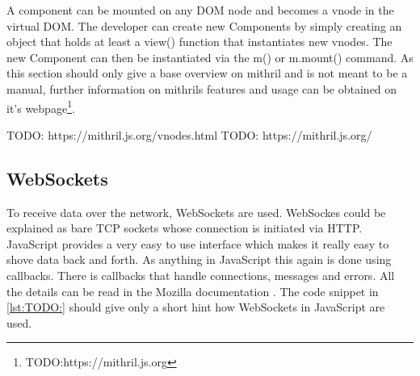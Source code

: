A component can be mounted on any DOM node and becomes a vnode in the virtual DOM. The developer can create new Components by simply creating an object that holds at least a view() function that instantiates new vnodes.
The new Component can then be instantiated via the m() or m.mount() command.
As this section should only give a base overview on mithril and is not meant to be a manual, further information on mithrils features and usage can be obtained on it's webpage\footnote{TODO:https://mithril.js.org}.

TODO: https://mithril.js.org/vnodes.html
TODO: https://mithril.js.org/

\subsection{WebSockets}

To receive data over the network, WebSockets are used. WebSockes could be explained as bare TCP sockets whose connection is initiated via HTTP.
JavaScript provides a very easy to use interface which makes it really easy to shove data back and forth.
As anything in JavaScript this again is done using callbacks. There is callbacks that handle connections, messages and errors. All the details can be read in the Mozilla documentation \cite{TODO: https://www.html5rocks.com/en/tutorials/websockets/basics/}. The code snippet in \ref{lst:TODO:} should give only a short hint how WebSockets in JavaScript are used.

